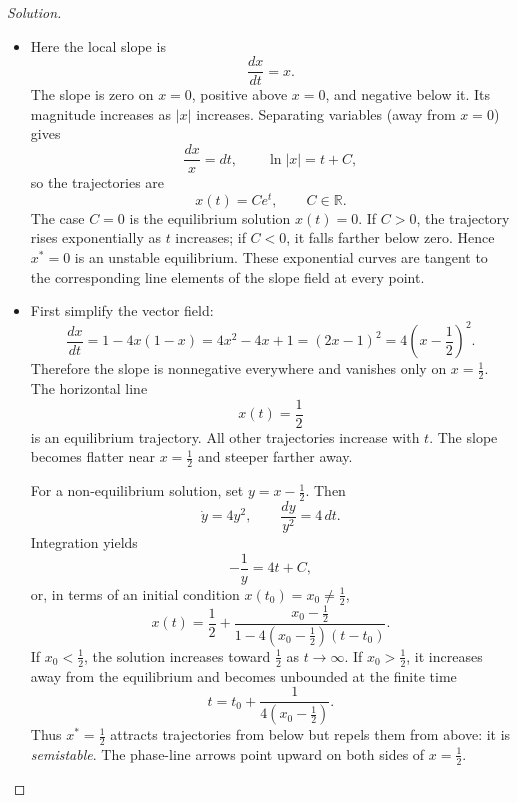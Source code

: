 \documentclass[10pt]{amsart}
\newenvironment{solution}
{\begin{proof}[Solution]}
{\end{proof}}
\begin{document}
\begin{onehalfspace}
\begin{solution}
            \begin{itemize}
                \item[(a)] Here the local slope is
                \[
                    \frac{dx}{dt}=x.
                \]
                The slope is zero on $x=0$, positive above $x=0$, and negative below it.
                Its magnitude increases as $|x|$ increases. Separating variables (away
                from $x=0$) gives
                \[
                    \frac{dx}{x}=dt,
                    \qquad \ln|x|=t+C,
                \]
                so the trajectories are
                \[
                    \boxed{x(t)=Ce^t}, \qquad C\in\mathbb{R}.
                \]
                The case $C=0$ is the equilibrium solution $x(t)=0$. If $C>0$, the
                trajectory rises exponentially as $t$ increases; if $C<0$, it falls
                farther below zero. Hence $x^*=0$ is an unstable equilibrium. These
                exponential curves are tangent to the corresponding line elements of the
                slope field at every point.

                \item[(c)] First simplify the vector field:
                \[
                    \frac{dx}{dt}=1-4x(1-x)=4x^2-4x+1=(2x-1)^2
                    =4\left(x-\frac12\right)^2.
                \]
                Therefore the slope is nonnegative everywhere and vanishes only on
                $x=\tfrac12$. The horizontal line
                \[
                    \boxed{x(t)=\frac12}
                \]
                is an equilibrium trajectory. All other trajectories increase with $t$.
                The slope becomes flatter near $x=\tfrac12$ and steeper farther away.

                For a non-equilibrium solution, set $y=x-\tfrac12$. Then
                \[
                    \dot y=4y^2,
                    \qquad \frac{dy}{y^2}=4\,dt.
                \]
                Integration yields
                \[
                    -\frac1y=4t+C,
                \]
                or, in terms of an initial condition $x(t_0)=x_0\ne\tfrac12$,
                \[
                    \boxed{
                        x(t)=\frac12+
                        \frac{x_0-\frac12}{1-4\left(x_0-\frac12\right)(t-t_0)} }.
                \]
                If $x_0<\tfrac12$, the solution increases toward $\tfrac12$ as
                $t\to\infty$. If $x_0>\tfrac12$, it increases away from the equilibrium
                and becomes unbounded at the finite time
                \[
                    t=t_0+\frac{1}{4(x_0-\frac12)}.
                \]
                Thus $x^*=\tfrac12$ attracts trajectories from below but repels them from
                above: it is \emph{semistable}. The phase-line arrows point upward on
                both sides of $x=\tfrac12$.
            \end{itemize}
            \clearpage

\end{solution}
\end{onehalfspace}
\end{document}
